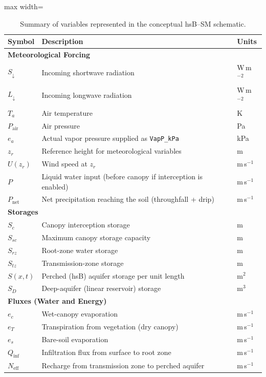 \documentclass[12pt]{article}
\begin{document}
 \begin{table}[h!]
\centering
\caption{Summary of variables represented in the conceptual hsB--SM schematic.}
\begin{adjustbox}{max width=\linewidth}\begin{tabular}{@{}lll@{}}
\toprule
\textbf{Symbol} & \textbf{Description} & \textbf{Units} \\
\midrule
\multicolumn{3}{l}{\textbf{Meteorological Forcing}} \\
$S_\downarrow$ & Incoming shortwave radiation & W\,m$^{-2}$ \\
$L_\downarrow$ & Incoming longwave radiation & W\,m$^{-2}$ \\
$T_a$ & Air temperature & K \\
$P_{\mathrm{air}}$ & Air pressure & Pa \\
$e_a$ & Actual vapor pressure supplied as \texttt{VapP\_kPa} & kPa \\
$z_r$ & Reference height for meteorological variables & m \\
$U(z_r)$ & Wind speed at $z_r$ & m\,s$^{-1}$ \\
$P$ & Liquid water input (before canopy if interception is enabled) & m\,s$^{-1}$ \\
$P_{\text{net}}$ & Net precipitation reaching the soil (throughfall + drip) & m\,s$^{-1}$ \\
\midrule
\multicolumn{3}{l}{\textbf{Storages}} \\
$S_c$ & Canopy interception storage & m \\
$S_{sc}$ & Maximum canopy storage capacity & m \\
$S_{rz}$ & Root-zone water storage & m \\
$S_{tz}$ & Transmission-zone storage & m \\
$S(x,t)$ & Perched (hsB) aquifer storage per unit length & m$^{2}$ \\
$S_D$ & Deep-aquifer (linear reservoir) storage & m$^{3}$ \\
\midrule
\multicolumn{3}{l}{\textbf{Fluxes (Water and Energy)}} \\
$e_c$ & Wet-canopy evaporation & m\,s$^{-1}$ \\
$e_T$ & Transpiration from vegetation (dry canopy) & m\,s$^{-1}$ \\
$e_s$ & Bare-soil evaporation & m\,s$^{-1}$ \\
$Q_{\text{inf}}$ & Infiltration flux from surface to root zone & m\,s$^{-1}$ \\
$N_{\text{eff}}$ & Recharge from transmission zone to perched aquifer & m\,s$^{-1}$ \\

\end{tabular}
\end{adjustbox}
\end{table}
\end{document}
